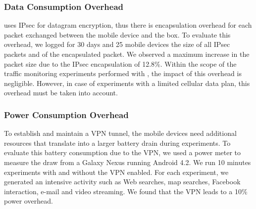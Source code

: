 
\subsubsection{Data Consumption Overhead}
\platname{} uses IPsec for datagram encryption, thus there is
encapsulation overhead for each packet exchanged between the mobile
device and the \platname{} box. To evaluate this overhead, we logged
for 30 days and 25 mobile devices the size of all IPsec packets and of
the encapsulated packet. We observed a maximum increase in the packet
size due to the IPsec encapsulation of 12.8\%. Within the scope of the
traffic monitoring experiments performed with \platname{}, the impact
of this overhead is negligible. However, in case of experiments with a
limited cellular data plan, this overhead must be taken into account. 





\subsubsection{Power Consumption Overhead}
To establish and maintain a VPN tunnel, the mobile devices need
additional resources that translate into a larger battery drain during
experiments. To evaluate this battery consumption due to the VPN, we
used a power meter to measure the draw from a Galaxy Nexus running
Android 4.2. We run 10 minutes experiments with and without the VPN
enabled. For each experiment, we generated an intensive activity such
as Web searches, map searches, Facebook interaction, e-mail and video
streaming. We found that the VPN leads to a 10\% power overhead. 

